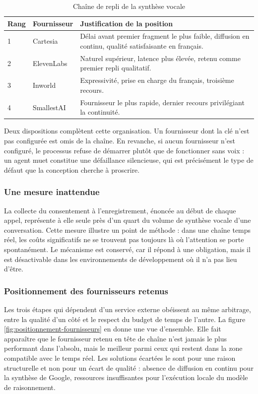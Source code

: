 \begin{table}[H]
\centering
\renewcommand{\arraystretch}{1.25}
\begin{tabular}{|p{1.2cm}|p{3.2cm}|p{10.1cm}|}
\hline
\textbf{Rang} & \textbf{Fournisseur} & \textbf{Justification de la position} \\
\hline
1 & Cartesia & Délai avant premier fragment le plus faible, diffusion en continu, qualité satisfaisante en français. \\
\hline
2 & ElevenLabs & Naturel supérieur, latence plus élevée, retenu comme premier repli qualitatif. \\
\hline
3 & Inworld & Expressivité, prise en charge du français, troisième recours. \\
\hline
4 & SmallestAI & Fournisseur le plus rapide, dernier recours privilégiant la continuité. \\
\hline
\end{tabular}
\caption{Chaîne de repli de la synthèse vocale}
\label{tab:tts-chaine}
\end{table}

Deux dispositions complètent cette organisation. Un fournisseur dont la clé n'est pas configurée est omis de la chaîne. En revanche, si aucun fournisseur n'est configuré, le processus refuse de démarrer plutôt que de fonctionner sans voix : un agent muet constitue une défaillance silencieuse, qui est précisément le type de défaut que la conception cherche à proscrire.

\subsubsection{Une mesure inattendue}

La collecte du consentement à l'enregistrement, énoncée au début de chaque appel, représente à elle seule près d'un quart du volume de synthèse vocale d'une conversation. Cette mesure illustre un point de méthode : dans une chaîne temps réel, les coûts significatifs ne se trouvent pas toujours là où l'attention se porte spontanément. Le mécanisme est conservé, car il répond à une obligation, mais il est désactivable dans les environnements de développement où il n'a pas lieu d'être.

\subsubsection{Positionnement des fournisseurs retenus}

Les trois étapes qui dépendent d'un service externe obéissent au même arbitrage, entre la qualité d'un côté et le respect du budget de temps de l'autre. La figure \ref{fig:positionnement-fournisseurs} en donne une vue d'ensemble. Elle fait apparaître que le fournisseur retenu en tête de chaîne n'est jamais le plus performant dans l'absolu, mais le meilleur parmi ceux qui restent dans la zone compatible avec le temps réel. Les solutions écartées le sont pour une raison structurelle et non pour un écart de qualité : absence de diffusion en continu pour la synthèse de Google, ressources insuffisantes pour l'exécution locale du modèle de raisonnement.

